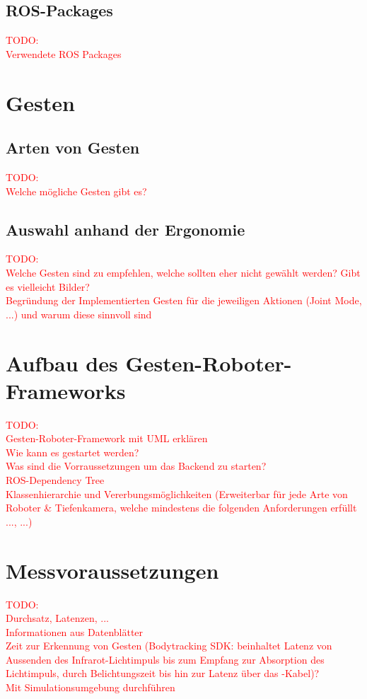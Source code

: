 \subsection{ROS-Packages}
\textcolor{red}{TODO:\\
Verwendete ROS Packages
}


\section{Gesten}


\subsection{Arten von Gesten}
\textcolor{red}{TODO:\\
Welche mögliche Gesten gibt es?
}

\subsection{Auswahl anhand der Ergonomie}
\textcolor{red}{TODO:\\
Welche Gesten sind zu empfehlen, welche sollten eher nicht gewählt werden? Gibt es vielleicht Bilder?\\
Begründung der Implementierten Gesten für die jeweiligen Aktionen (Joint Mode, ...) und warum diese sinnvoll sind
}


\section{Aufbau des Gesten-Roboter-Frameworks}
\textcolor{red}{TODO:\\
Gesten-Roboter-Framework mit UML erklären\\
Wie kann es gestartet werden?\\
Was sind die Vorraussetzungen um das Backend zu starten?\\
ROS-Dependency Tree\\
Klassenhierarchie und Vererbungsmöglichkeiten (Erweiterbar für jede Arte von Roboter \& Tiefenkamera, welche mindestens die folgenden Anforderungen erfüllt ..., ...)
}


\section{Messvoraussetzungen}
\textcolor{red}{TODO:\\
Durchsatz, Latenzen, ...\\
Informationen aus Datenblätter\\
Zeit zur Erkennung von Gesten (Bodytracking SDK: beinhaltet Latenz von Aussenden des Infrarot-Lichtimpuls bis zum Empfang zur Absorption des Lichtimpuls, durch Belichtungszeit bis hin zur Latenz über das -Kabel)?\\
Mit Simulationsumgebung durchführen
}
